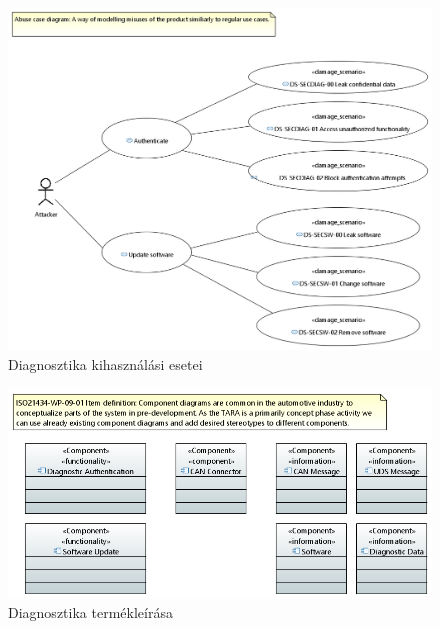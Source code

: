 \begin{figure}[!ht]
	\centering
	\includegraphics[width=130mm, keepaspectratio]{figures/06_01_abuse_case_diagram.PNG}
	\caption{Diagnosztika kihasználási esetei}
	\label{fig:diag_abuse}
\end{figure}

\begin{figure}[!ht]
	\centering
	\includegraphics[width=130mm, keepaspectratio]{figures/06_02_item_definition_diagram.PNG}
	\caption{Diagnosztika termékleírása}
\end{figure}